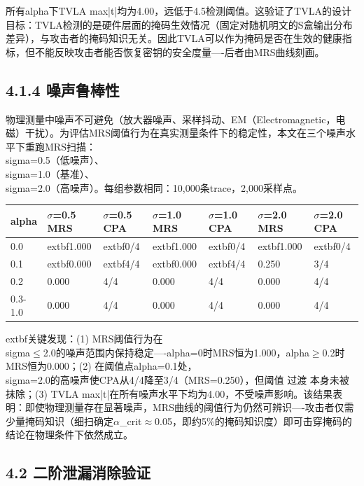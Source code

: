 \documentclass[journal]{IEEEtran}
\begin{document}
所有alpha下TVLA max|t|均为4.00，远低于4.5检测阈值。这验证了TVLA的设计目标：TVLA检测的是硬件层面的掩码生效情况（固定对随机明文的S盒输出分布差异），与攻击者的掩码知识无关。因此TVLA可以作为掩码是否在生效的健康指标，但不能反映攻击者能否恢复密钥的安全度量----后者由MRS曲线刻画。

\subsection{4.1.4 噪声鲁棒性}

物理测量中噪声不可避免（放大器噪声、采样抖动、EM（Electromagnetic，电磁）干扰）。为评估MRS阈值行为在真实测量条件下的稳定性，本文在三个噪声水平下重跑MRS扫描：\\sigma=0.5（低噪声）、\\sigma=1.0（基准）、\\sigma=2.0（高噪声）。每组参数相同：10,000条trace，2,000采样点。

\begin{table}[h]
\centering
\begin{tabular}{lllllll}
\hline
\textbf{alpha} & \textbf{$\sigma$=0.5 MRS} & \textbf{$\sigma$=0.5 CPA} & \textbf{$\sigma$=1.0 MRS} & \textbf{$\sigma$=1.0 CPA} & \textbf{$\sigma$=2.0 MRS} & \textbf{$\sigma$=2.0 CPA} \\
\hline
0.0 & 	extbf{1.000} & 	extbf{0/4} & 	extbf{1.000} & 	extbf{0/4} & 	extbf{1.000} & 	extbf{0/4} \\
0.1 & 	extbf{0.000} & 	extbf{4/4} & 	extbf{0.000} & 	extbf{4/4} & 0.250 & 3/4 \\
0.2 & 0.000 & 4/4 & 0.000 & 4/4 & 0.000 & 4/4 \\
0.3-1.0 & 0.000 & 4/4 & 0.000 & 4/4 & 0.000 & 4/4 \\
\hline
\end{tabular}
\end{table}

	extbf{关键发现}：(1) MRS阈值行为在\\sigma$\leq$2.0的噪声范围内保持稳定----alpha=0时MRS恒为1.000，alpha$\geq$0.2时MRS恒为0.000；(2) 在阈值点alpha=0.1处，\\sigma=2.0的高噪声使CPA从4/4降至3/4（MRS=0.250），但阈值 过渡 本身未被抹除；(3) TVLA max|t|在所有噪声水平下均为4.00，不受噪声影响。该结果表明：即使物理测量存在显著噪声，MRS曲线的阈值行为仍然可辨识----攻击者仅需少量掩码知识（细扫确定$\alpha$\_crit$\approx$0.05，即约5\%的掩码知识度）即可击穿掩码的结论在物理条件下依然成立。

%


\subsection{4.2 二阶泄漏消除验证}
\end{document}
